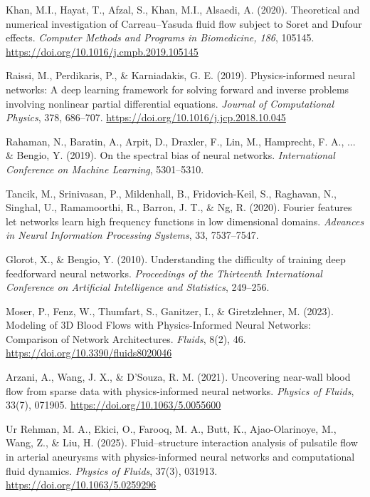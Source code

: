 ﻿\documentclass[12pt,a4paper]{article}
\theoremstyle{definition}
\numberwithin{equation}{section}
\begin{document}
\begin{thebibliography}{}
 Khan, M.I., Hayat, T., Afzal, S., Khan, M.I., Alsaedi, A. (2020). Theoretical and numerical investigation of Carreau–Yasuda fluid flow subject to Soret and Dufour effects. \textit{Computer Methods and Programs in Biomedicine, 186}, 105145. \url{https://doi.org/10.1016/j.cmpb.2019.105145}

{ Raissi, M., Perdikaris, P., \& Karniadakis, G. E. (2019). Physics-informed neural networks: A deep learning framework for solving forward and inverse problems involving nonlinear partial differential equations. \textit{Journal of Computational Physics}, 378, 686--707. \url{https://doi.org/10.1016/j.jcp.2018.10.045}}

{ Rahaman, N., Baratin, A., Arpit, D., Draxler, F., Lin, M., Hamprecht, F. A., ... \& Bengio, Y. (2019). On the spectral bias of neural networks. \textit{International Conference on Machine Learning}, 5301--5310.}

{ Tancik, M., Srinivasan, P., Mildenhall, B., Fridovich-Keil, S., Raghavan, N., Singhal, U., Ramamoorthi, R., Barron, J. T., \& Ng, R. (2020). Fourier features let networks learn high frequency functions in low dimensional domains. \textit{Advances in Neural Information Processing Systems}, 33, 7537--7547.}

{ Glorot, X., \& Bengio, Y. (2010). Understanding the difficulty of training deep feedforward neural networks. \textit{Proceedings of the Thirteenth International Conference on Artificial Intelligence and Statistics}, 249--256.}

{ Moser, P., Fenz, W., Thumfart, S., Ganitzer, I., \& Giretzlehner, M. (2023). Modeling of 3D Blood Flows with Physics-Informed Neural Networks: Comparison of Network Architectures. \textit{Fluids}, 8(2), 46. \url{https://doi.org/10.3390/fluids8020046}}

{ Arzani, A., Wang, J. X., \& D'Souza, R. M. (2021). Uncovering near-wall blood flow from sparse data with physics-informed neural networks. \textit{Physics of Fluids}, 33(7), 071905. \url{https://doi.org/10.1063/5.0055600}}

{ Ur Rehman, M. A., Ekici, O., Farooq, M. A., Butt, K., Ajao-Olarinoye, M., Wang, Z., \& Liu, H. (2025). Fluid--structure interaction analysis of pulsatile flow in arterial aneurysms with physics-informed neural networks and computational fluid dynamics. \textit{Physics of Fluids}, 37(3), 031913. \url{https://doi.org/10.1063/5.0259296}}


\end{thebibliography}
\end{document}
